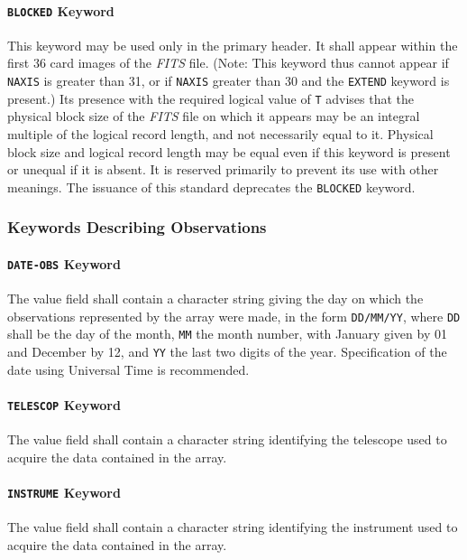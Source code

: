  \paragraph{{\tt BLOCKED} Keyword}
 This keyword may be used only in the primary  \label{s:block}
 header.  
 It shall appear within the 
 first 36 card images of the {\em FITS\/} file.
 (Note:  This keyword thus cannot appear if {\tt NAXIS} is 
 greater than 31, or if {\tt NAXIS} greater than 30 and the 
 {\tt EXTEND} keyword is present.) 
 Its presence with the required logical value of {\tt T} advises that 
 the physical block size of the {\em FITS\/} file on which it
 appears may be an integral multiple of the logical record length,
 and not necessarily equal to it.
 Physical block size and logical record length may be
 equal even if this keyword is present or unequal if it
 is absent.  It is reserved primarily to prevent its use
 with other meanings. The issuance of this standard 
 deprecates the
 {\tt BLOCKED} keyword.
  
     \subsubsection{Keywords Describing Observations}
     \label{s:kobs}
 \paragraph{{\tt DATE-OBS} Keyword}
 The value field shall contain a character 
 string
 giving the day on which the observations represented by the array were 
 made, in the form {\tt DD/MM/YY}, where {\tt DD} shall be the day of the
 month, {\tt MM} the month number, with January given by
 01 and December by 12, and {\tt YY} the last two digits of the year.
 Specification of the date using Universal 
 Time is recommended.

 \paragraph{{\tt TELESCOP} Keyword}
 The value field shall contain a character 
 string
 identifying the telescope used to acquire the data
 contained in the array.
  
 \paragraph{{\tt INSTRUME} Keyword}
 The value field shall contain a character 
 string
 identifying the instrument used to acquire the data
 contained in the array.
  
